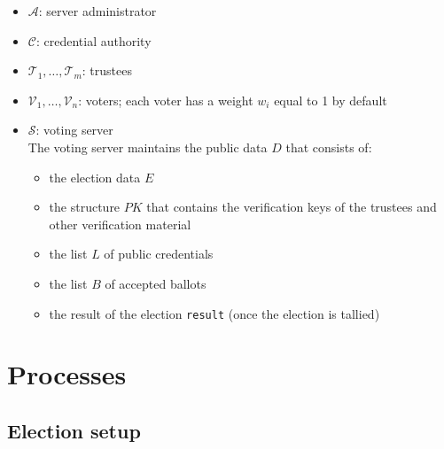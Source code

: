 \documentclass[a4paper]{article}
\newcommand{\result}{\texttt{result}}
\begin{document}
\begin{itemize}
\item $\mathcal{A}$: server administrator
\item $\mathcal{C}$: credential authority
\item $\mathcal{T}_1,\dots,\mathcal{T}_m$: trustees
\item $\mathcal{V}_1,\dots,\mathcal{V}_n$: voters; each voter has a
    weight $w_i$ equal to 1 by default
\item $\mathcal{S}$: voting server \\
  The voting server maintains the public data $D$ that
consists of:
  \begin{itemize}
  \item the election data $E$
  \item the structure $PK$ that contains the verification keys of the
    trustees and other verification material
  \item the list $L$ of public credentials
  \item the list $B$ of accepted ballots
  \item the result of the election {\result} (once the election is tallied)
  \end{itemize}
\end{itemize}

\section{Processes}
\label{processes}

\subsection{Election setup}
\label{election-setup}
\end{document}
